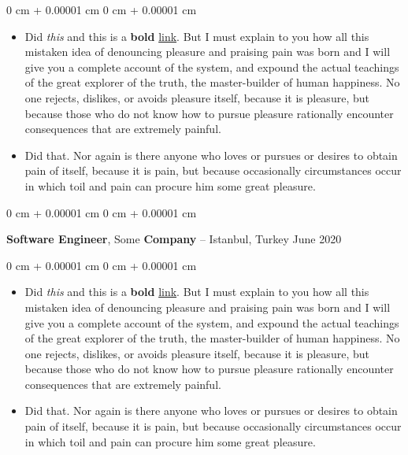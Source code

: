 \documentclass[10pt, letterpaper]{article}
\newenvironment{highlights}{
    \begin{itemize}[
        topsep=0.10 cm,
        parsep=0.10 cm,
        partopsep=0pt,
        itemsep=0pt,
        leftmargin=0 cm + 10pt
    ]
}{
    \end{itemize}
} %
\newenvironment{onecolentry}{
    \begin{adjustwidth}{
        0 cm + 0.00001 cm
    }{
        0 cm + 0.00001 cm
    }
}{
    \end{adjustwidth}
} %
\newenvironment{twocolentry}[2][]{
    \onecolentry
    \def\secondColumn{#2}
    \setcolumnwidth{\fill, 4.5 cm}
    \begin{paracol}{2}
}{
    \switchcolumn \raggedleft \secondColumn
    \end{paracol}
    \endonecolentry
} %
\begin{document}
        \vspace{0.10 cm}
        \begin{onecolentry}
            \begin{highlights}
                \item Did \textit{this} and this is a \textbf{bold} \href{https://example.com}{link}. But I must explain to you how all this mistaken idea of denouncing pleasure and praising pain was born and I will give you a complete account of the system, and expound the actual teachings of the great explorer of the truth, the master-builder of human happiness. No one rejects, dislikes, or avoids pleasure itself, because it is pleasure, but because those who do not know how to pursue pleasure rationally encounter consequences that are extremely painful.
                \item Did that. Nor again is there anyone who loves or pursues or desires to obtain pain of itself, because it is pain, but because occasionally circumstances occur in which toil and pain can procure him some great pleasure.
            \end{highlights}
        \end{onecolentry}


        \vspace{0.2 cm}

        \begin{twocolentry}{
            June 2020
        }
            \textbf{Software Engineer}, Some \textbf{Company} -- Istanbul, Turkey\end{twocolentry}

        \vspace{0.10 cm}
        \begin{onecolentry}
            \begin{highlights}
                \item Did \textit{this} and this is a \textbf{bold} \href{https://example.com}{link}. But I must explain to you how all this mistaken idea of denouncing pleasure and praising pain was born and I will give you a complete account of the system, and expound the actual teachings of the great explorer of the truth, the master-builder of human happiness. No one rejects, dislikes, or avoids pleasure itself, because it is pleasure, but because those who do not know how to pursue pleasure rationally encounter consequences that are extremely painful.
                \item Did that. Nor again is there anyone who loves or pursues or desires to obtain pain of itself, because it is pain, but because occasionally circumstances occur in which toil and pain can procure him some great pleasure.
            \end{highlights}
        \end{onecolentry}
\end{document}
